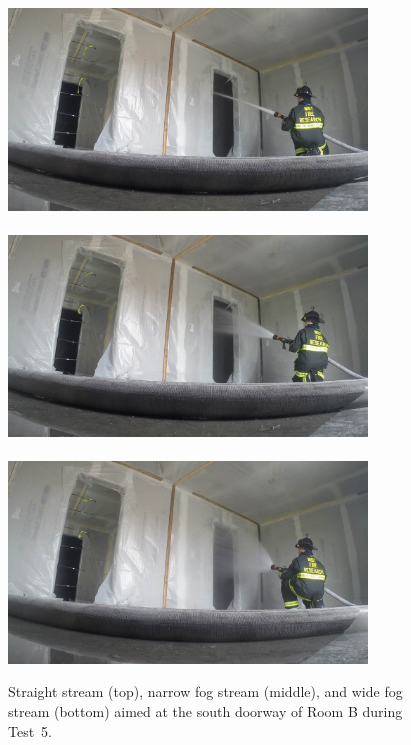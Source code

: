 \documentclass[12pt,oneside]{book}
\begin{document}
\begin{figure}[!ht]
	\includegraphics[trim=23cm 6.5cm 4cm 6cm, clip=true, width=3.75in]{../Figures/Pictures/SS_Room_B_Test_34}
	\\~\\
	\includegraphics[trim=23cm 6.5cm 4cm 6cm, clip=true, width=3.75in]{../Figures/Pictures/NF_Room_B_Test_34}
	\\~\\
	\includegraphics[trim=23cm 6.5cm 4cm 6cm, clip=true, width=3.75in]{../Figures/Pictures/WF_Room_B_Test_34}
	\caption[Straight stream, narrow fog stream, and wide fog stream during Test~5.]{Straight stream (top), narrow fog stream (middle), and wide fog stream (bottom) aimed at the south doorway of Room B during Test~5.}
	\label{fig:test_5_pic}
\end{figure}
\end{document}

